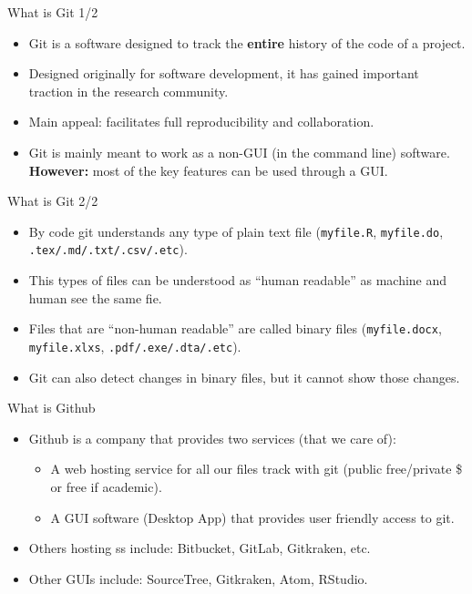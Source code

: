 \documentclass[ignorenonframetext,]{beamer}
\providecommand{\tightlist}{%
  \setlength{\itemsep}{0pt}\setlength{\parskip}{0pt}}
\begin{document}
\begin{frame}{What is Git 1/2}
\protect\hypertarget{what-is-git-12}{}

\begin{itemize}
\item
  Git is a software designed to track the \textbf{entire} history of the
  code of a project.
\item
  Designed originally for software development, it has gained important
  traction in the research community.
\item
  Main appeal: facilitates full reproducibility and collaboration.
\item
  Git is mainly meant to work as a non-GUI (in the command line)
  software.\\
  \textbf{However:} most of the key features can be used through a GUI.
\end{itemize}

\end{frame}

\begin{frame}[fragile]{What is Git 2/2}
\protect\hypertarget{what-is-git-22}{}

\begin{itemize}
\item
  By code git understands any type of plain text file
  (\texttt{myfile.R}, \texttt{myfile.do},
  \texttt{.tex/.md/.txt/.csv/.etc}).
\item
  This types of files can be understood as ``human readable'' as machine
  and human see the same fie.
\item
  Files that are ``non-human readable'' are called binary files
  (\texttt{myfile.docx}, \texttt{myfile.xlxs},
  \texttt{.pdf/.exe/.dta/.etc}).
\item
  Git can also detect changes in binary files, but it cannot show those
  changes.
\end{itemize}

\end{frame}

\begin{frame}{What is Github}
\protect\hypertarget{what-is-github}{}

\begin{itemize}
\item
  Github is a company that provides two services (that we care of):

  \begin{itemize}
  \tightlist
  \item
    A web hosting service for all our files track with git (public
    free/private \$ or free if academic).\\
  \item
    A GUI software (Desktop App) that provides user friendly access to
    git.
  \end{itemize}
\item
  Others hosting ss include: Bitbucket, GitLab, Gitkraken, etc.
\item
  Other GUIs include: SourceTree, Gitkraken, Atom, RStudio.
\end{itemize}

\end{frame}
\end{document}
